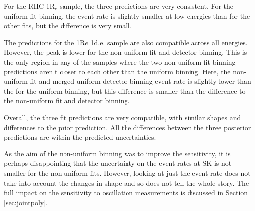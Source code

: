 For the RHC 1R$_e$ sample, the three predictions are very consistent. For the uniform fit binning, the event rate is slightly smaller at low energies than for the other fits, but the difference is very small.

The predictions for the 1R$e$ 1d.e. sample are also compatible across all energies. However, the peak is lower for the non-uniform fit and detector binning. This is the only region in any of the samples where the two non-uniform fit binning predictions aren't closer to each other than the uniform binning. Here, the non-uniform fit and merged-uniform detector binning event rate is slightly lower than the for the uniform binning, but this difference is smaller than the difference to the non-uniform fit and detector binning. 

Overall, the three fit predictions are very compatible, with similar shapes and differences to the prior prediction. All the differences between the three posterior predictions are within the predicted uncertainties.

As the aim of the non-uniform binning was to improve the sensitivity, it is perhaps disappointing that the uncertainty on the event rates at SK is not smaller for the non-uniform fits. However, looking at just the event rate does not take into account the changes in shape and so does not tell the whole story. The full impact on the sensitivity to oscillation measurements is discussed in Section \ref{sec:jointpoly}.

